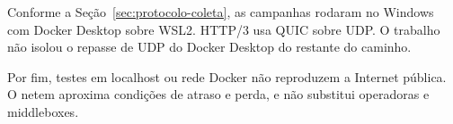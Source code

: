 Conforme a Seção~\ref{sec:protocolo-coleta}, as campanhas rodaram no Windows com Docker Desktop sobre WSL2. HTTP/3 usa QUIC sobre UDP. O trabalho não isolou o repasse de UDP do Docker Desktop do restante do caminho.

Por fim, testes em localhost ou rede Docker não reproduzem a Internet pública. O netem aproxima condições de atraso e perda, e não substitui operadoras e middleboxes.
